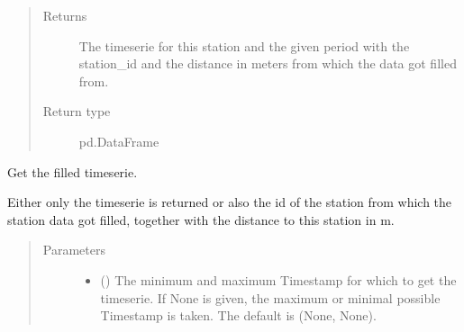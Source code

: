 \documentclass[letterpaper,10pt,english]{sphinxmanual}
\begin{document}
\begin{fulllineitems}
\begin{fulllineitems}
\begin{quote}
\begin{description}
\item[{Returns}] \leavevmode
\sphinxAtStartPar
The timeserie for this station and the given period with the station\_id and the distance in meters from which the data got filled from.

\item[{Return type}] \leavevmode
\sphinxAtStartPar
pd.DataFrame

\end{description}\end{quote}

\end{fulllineitems}


\begin{fulllineitems}
\label{\detokenize{weatherDB:weatherDB.station.StationBase.get_filled}}
\sphinxAtStartPar
Get the filled timeserie.

\sphinxAtStartPar
Either only the timeserie is returned or also the id of the station from which the station data got filled, together with the distance to this station in m.
\begin{quote}\begin{description}
\item[{Parameters}] \leavevmode\begin{itemize}
\item {} 
\sphinxAtStartPar
{} ({\hyperref[\detokenize{weatherDB.lib:weatherDB.lib.utils.TimestampPeriod}]{}}\sphinxstyleliteralemphasis{\sphinxupquote{(}}\sphinxstyleliteralemphasis{\sphinxupquote{)}}\sphinxstyleliteralemphasis{\sphinxupquote{, }}) \textendash{} The minimum and maximum Timestamp for which to get the timeserie.
If None is given, the maximum or minimal possible Timestamp is taken.
The default is (None, None).


\end{itemize}
\end{description}
\end{quote}
\end{fulllineitems}
\end{fulllineitems}
\end{document}
